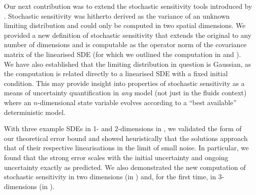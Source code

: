 Our next contribution was to extend the stochastic sensitivity tools introduced by \citet{Balasuriya_2020_StochasticSensitivityComputable}.
Stochastic sensitivity was hitherto derived as the variance of an unknown limiting distribution and could only be computed in two spatial dimensions.
We provided a new definition of stochastic sensitivity that extends the original to any number of dimensions and is computable as the operator norm of the covariance matrix of the linearised SDE (for which we outlined the computation in  and ).
We have also established that the limiting distribution in question is Gaussian, as the computation is related directly to a linearised SDE with a fixed initial condition.
This may provide insight into properties of stochastic sensitivity as a means of uncertainty quantification in \emph{any} model (not just in the fluids context) where an \(n\)-dimensional state variable evolves according to a ``best available'' deterministic model.

With three example SDEs in 1- and 2-dimensions in , we validated the form of our theoretical error bound and showed heuristically that the solutions approach that of their respective linearisations in the limit of small noise.
In particular, we found that the strong error scales with the initial uncertainty and ongoing uncertainty exactly as predicted.
We also demonstrated the new computation of stochastic sensitivity in two dimensions (in ) and, for the first time, in 3-dimensions (in ).

